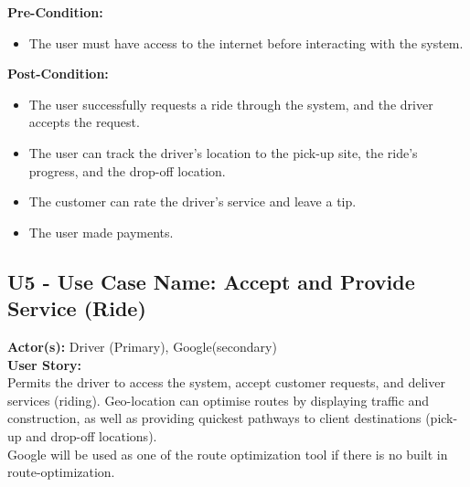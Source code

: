 \documentclass[9pt]{report}
\begin{document}
\textbf{Pre-Condition:} 
\begin{itemize}
    \item The user must have access to the internet before interacting with the system.
\end{itemize}
\textbf{Post-Condition:} 
\begin{itemize}
    \item The user successfully requests a ride through the system, and the driver accepts the request.
    \item The user can track the driver's location to the pick-up site, the ride's progress, and the drop-off location.
    \item The customer can rate the driver's service and leave a tip.
    \item The user made payments.
\end{itemize}

\subsection*{U5 - Use Case Name: Accept and Provide Service (Ride)}
\textbf{Actor(s):} Driver (Primary), Google(secondary)
\textbf{\\User Story:}
\\Permits the driver to access the system, accept customer requests, and deliver services (riding).
Geo-location can optimise routes by displaying traffic and construction, as well as providing quickest pathways to client destinations (pick-up and drop-off locations). \\Google will be used as one of the route optimization tool if there is no built in route-optimization.
\end{document}
